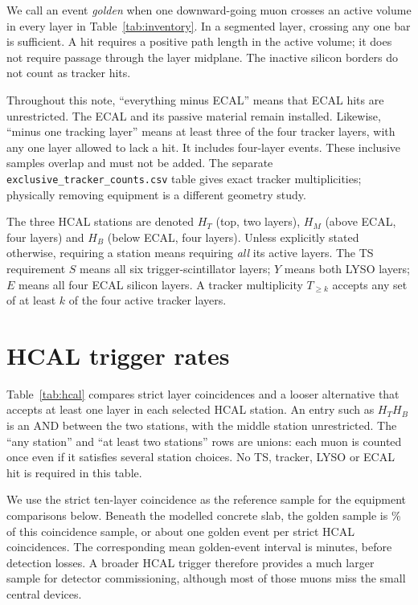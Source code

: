 

We call an event \emph{golden} when one downward-going muon crosses an active
volume in every layer in Table~\ref{tab:inventory}. In a segmented layer,
crossing any one bar is sufficient. A hit requires a positive path length in
the active volume; it does not require passage through the layer midplane.
The inactive silicon borders do not count as tracker hits.

Throughout this note, ``everything minus ECAL'' means that ECAL hits are
unrestricted. The ECAL and its passive material remain installed. Likewise,
``minus one tracking layer'' means at least three of the four tracker layers,
with any one layer allowed to lack a hit. It includes four-layer events.
These inclusive samples overlap and must not be added. The separate
\texttt{exclusive\_tracker\_counts.csv} table gives exact tracker multiplicities;
physically removing equipment is a different geometry study.

The three HCAL stations are denoted $H_T$ (top, two layers), $H_M$ (above ECAL,
four layers) and $H_B$ (below ECAL, four layers). Unless explicitly stated
otherwise, requiring a station means requiring \emph{all} its active layers.
The TS requirement $S$ means all six trigger-scintillator layers; $Y$ means both
LYSO layers; $E$ means all four ECAL silicon layers. A tracker multiplicity
$T_{\ge k}$ accepts any set of at least $k$ of the four active tracker layers.



\section{HCAL trigger rates}
\label{sec:hcal}
Table~\ref{tab:hcal} compares strict layer coincidences and a looser alternative
that accepts at least one layer in each selected HCAL station. An entry such
as $H_T H_B$ is an AND between the two stations, with the middle station
unrestricted. The ``any station'' and ``at least two stations'' rows are unions:
each muon is counted once even if it satisfies several station choices.
No TS, tracker, LYSO or ECAL hit is required in this table.



We use the strict ten-layer coincidence as the reference sample for
the equipment comparisons below. Beneath the modelled concrete slab, the golden sample
is \goldFraction{}\% of this coincidence sample, or about one golden event per
\goldDenominator{} strict HCAL coincidences. The corresponding mean golden-event
interval is \goldWait{} minutes, before detection losses. A broader HCAL
trigger therefore provides a much larger sample for detector commissioning,
although most of those muons miss the small central devices.

